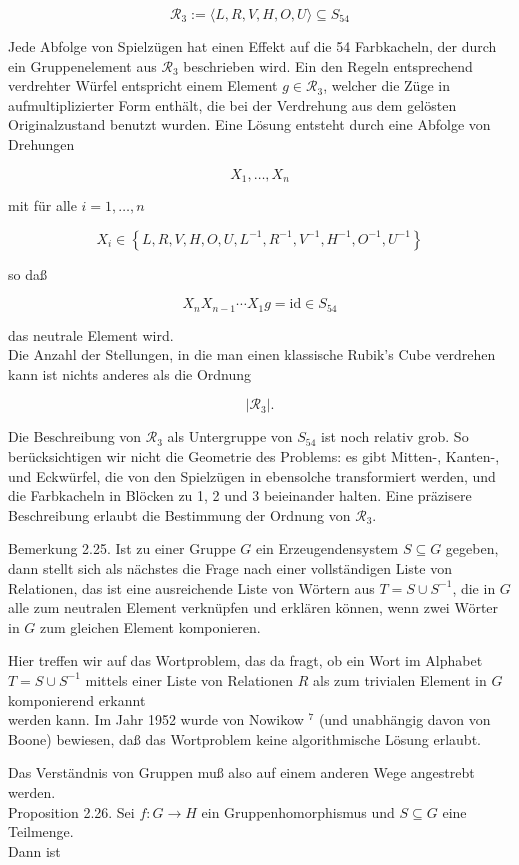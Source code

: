\documentclass[10pt, letterpaper]{article}
\begin{document}
$$
\mathscr{R}_{3}:=\langle L, R, V, H, O, U\rangle \subseteq S_{54}
$$

Jede Abfolge von Spielzügen hat einen Effekt auf die 54 Farbkacheln, der durch ein Gruppenelement aus $\mathscr{R}_{3}$ beschrieben wird. Ein den Regeln entsprechend verdrehter Würfel entspricht einem Element $g \in \mathscr{R}_{3}$, welcher die Züge in aufmultiplizierter Form enthält, die bei der Verdrehung aus dem gelösten Originalzustand benutzt wurden. Eine Lösung entsteht durch eine Abfolge von Drehungen

$$
X_{1}, \ldots, X_{n}
$$

mit für alle $i=1, \ldots, n$

$$
X_{i} \in\left\{L, R, V, H, O, U, L^{-1}, R^{-1}, V^{-1}, H^{-1}, O^{-1}, U^{-1}\right\}
$$

so daß

$$
X_{n} X_{n-1} \cdots X_{1} g=\mathrm{id} \in S_{54}
$$

das neutrale Element wird.\\
Die Anzahl der Stellungen, in die man einen klassische Rubik's Cube verdrehen kann ist nichts anderes als die Ordnung

$$
\left|\mathscr{R}_{3}\right| .
$$

Die Beschreibung von $\mathscr{R}_{3}$ als Untergruppe von $S_{54}$ ist noch relativ grob. So berücksichtigen wir nicht die Geometrie des Problems: es gibt Mitten-, Kanten-, und Eckwürfel, die von den Spielzügen in ebensolche transformiert werden, und die Farbkacheln in Blöcken zu 1, 2 und 3 beieinander halten. Eine präzisere Beschreibung erlaubt die Bestimmung der Ordnung von $\mathscr{R}_{3}$.

Bemerkung 2.25. Ist zu einer Gruppe $G$ ein Erzeugendensystem $S \subseteq G$ gegeben, dann stellt sich als nächstes die Frage nach einer vollständigen Liste von Relationen, das ist eine ausreichende Liste von Wörtern aus $T=S \cup S^{-1}$, die in $G$ alle zum neutralen Element verknüpfen und erklären können, wenn zwei Wörter in $G$ zum gleichen Element komponieren.

Hier treffen wir auf das Wortproblem, das da fragt, ob ein Wort im Alphabet $T=S \cup S^{-1}$ mittels einer Liste von Relationen $R$ als zum trivialen Element in $G$ komponierend erkannt\\
werden kann. Im Jahr 1952 wurde von Nowikow ${ }^{7}$ (und unabhängig davon von Boone) bewiesen, daß das Wortproblem keine algorithmische Lösung erlaubt.

Das Verständnis von Gruppen muß also auf einem anderen Wege angestrebt werden.\\
Proposition 2.26. Sei $f: G \rightarrow H$ ein Gruppenhomorphismus und $S \subseteq G$ eine Teilmenge.\\
Dann ist
\end{document}
